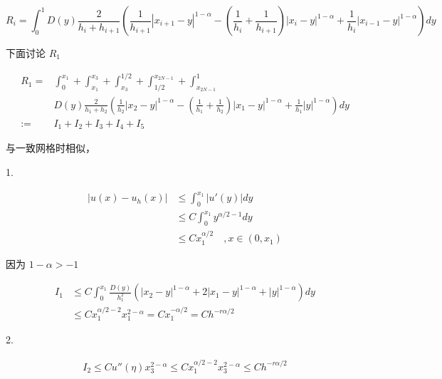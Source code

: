 \documentclass{ctexart}
\begin{document}
\begin{equation}
    R_i = \int_0^1 D(y) \frac{2}{h_i + h_{i+1}} 
    ( \frac{1}{h_{i+1}} |x_{i+1}-y|^{1-\alpha} 
    - (\frac{1}{h_{i}}+\frac{1}{h_{i+1}}) |x_{i}-y|^{1-\alpha}
    +  \frac{1}{h_{i}}|x_{i-1}-y|^{1-\alpha} )  dy 
\end{equation}



下面讨论 \(R_1\)

\begin{equation}
    \begin{aligned}
        R_1 =& \int_0^{x_1} + \int_{x_1}^{x_3} + \int_{x_3}^{1/2} + \int_{1/2}^{x_{2N-1}} + \int_{x_{2N-1}}^1  \\
        & D(y) \frac{2}{h_1 + h_{2}} 
        ( \frac{1}{h_{2}} |x_{2}-y|^{1-\alpha} 
        - (\frac{1}{h_{1}}+\frac{1}{h_{2}}) |x_{1}-y|^{1-\alpha}
        +  \frac{1}{h_{1}}|y|^{1-\alpha} )  dy \\
        := & I_1 + I_2 + I_3 + I_4 + I_5
    \end{aligned}
\end{equation}

与一致网格时相似，

1. 

\begin{equation}
    \begin{aligned}
        |u(x) - u_h(x)| &\le \int_0^{x_1} |u'(y)| dy    \\
        &\le C \int_0^{x_1} y^{\alpha/2-1} dy   \\
        &\le C x_1^{\alpha/2}    \quad , x\in (0, x_1)
    \end{aligned}
\end{equation}

因为 \(1-\alpha > -1\)

\begin{equation}
    \begin{aligned}
        I_1 & \le C \int_0^{x_1} \frac{D(y)}{h_1^2} 
        ( |x_{2}-y|^{1-\alpha} 
        +2 |x_{1}-y|^{1-\alpha}
        +|y|^{1-\alpha} )  dy       \\
        &\le C  x_1^{\alpha/2-2} x_1^{2-\alpha} = C x_1^{-\alpha/2} = C h^{-r\alpha/2}
    \end{aligned}
\end{equation}

2.

\begin{equation}
    \begin{aligned}
        I_2 \le C u''(\eta) x_3^{2-\alpha} \le C x_1^{\alpha/2-2} x_3^{2-\alpha} \le C h^{-r\alpha/2}
    \end{aligned}
\end{equation}
\end{document}
